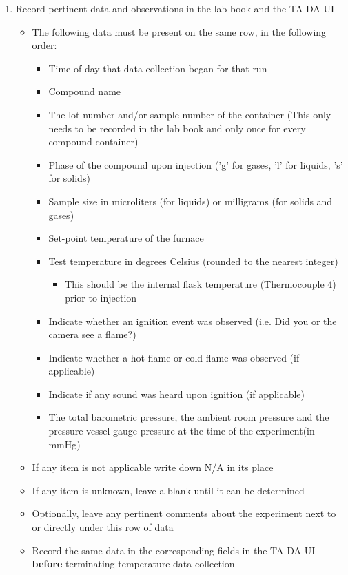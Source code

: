 \documentclass[letterpaper,11pt]{article}
\begin{document}
\begin{enumerate}
    \item Record pertinent data and observations in the lab book and the 
        TA-DA UI
        \begin{itemize}
        \item The following data must be present on the same row, in the 
            following order:
            \begin{itemize}
            \item Time of day that data collection began for that run
            \item Compound name 
            \item The lot number and/or sample number of the 
                container (This only needs to be recorded in the lab book  and 
                only once for every compound container)
            \item Phase of the compound upon injection ('g' for gases, 'l' for 
                liquids, 's' for solids)
            \item Sample size in microliters (for liquids) or milligrams
                (for solids and gases)
            \item Set-point temperature of the furnace
            \item Test temperature in degrees Celsius (rounded to the 
                nearest integer)
                \begin{itemize}
                \item This should be the internal flask temperature 
                    (Thermocouple 4) prior to injection
                \end{itemize}
            \item Indicate whether an ignition event was observed (i.e. Did you 
                or the camera see a flame?)
            \item Indicate whether a hot flame or cold flame was observed (if 
                applicable)
            \item Indicate if any sound was heard upon ignition (if applicable)
            \item The total barometric pressure, the ambient room pressure and the pressure vessel gauge pressure
				at the time of the experiment(in mmHg)
            \end{itemize}
        \item If any item is not applicable write down N/A in its place
        \item If any item is unknown, leave a blank until it can be determined
        \item Optionally, leave any pertinent comments about the experiment
            next to or directly under this row of data
        \item Record the same data in the corresponding fields in the TA-DA UI
            \textbf{before} terminating temperature data collection
        \end{itemize}
        

\end{enumerate}
\end{document}
